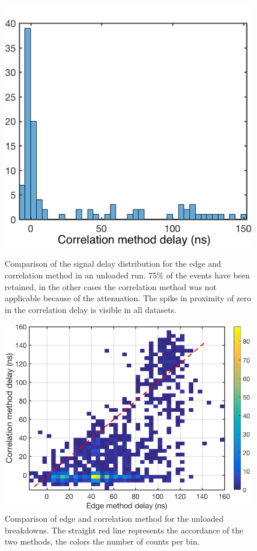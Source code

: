 \begin{figure}[p]
   {\includegraphics[scale=0.35]{pictures/Exp_UnLoaded43MW_6_correlation_method.png}}
\caption{Comparison of the signal delay distribution for the edge and correlation method in an unloaded run. 75\% of the events have been retained, in the other cases the correlation method was not applicable because of the attenuation.  The spike in proximity of zero in the correlation delay is visible in all datasets.\vspace{8mm}}
 \label{edge_vs_corr}
 
 \includegraphics[scale=0.5]{pictures/metods_comparison_2.png}
\caption{Comparison of edge and correlation method for the unloaded breakdowns. The straight red line represents the accordance of the two methods, the colors the number of counts per bin. }
\label{comp_corr_edge}
 
\end{figure}

